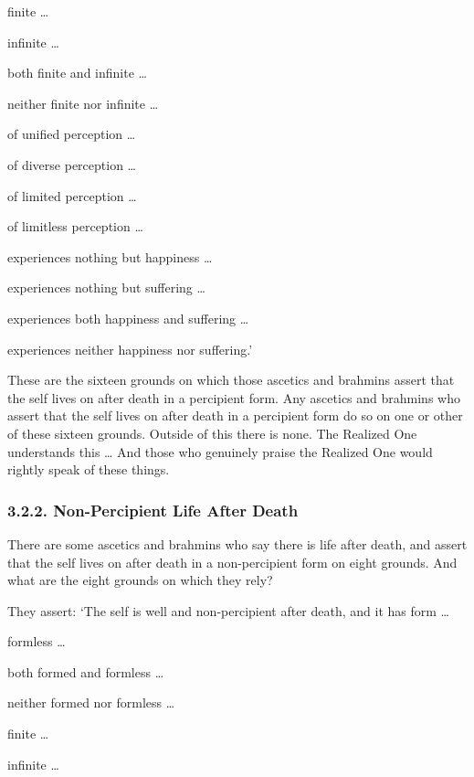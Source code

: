 \documentclass[12pt,openany]{book}%
\begin{document}
finite … 

infinite … 

both finite and infinite … 

neither finite nor infinite … 

of unified perception … 

of diverse perception … 

of limited perception … 

of limitless perception … 

experiences nothing but happiness … 

experiences nothing but suffering … 

experiences both happiness and suffering … 

experiences neither happiness nor suffering.’ 

These are the sixteen grounds on which those ascetics and brahmins assert that the self lives on after death in a percipient form. Any ascetics and brahmins who assert that the self lives on after death in a percipient form do so on one or other of these sixteen grounds. Outside of this there is none. The Realized One understands this … And those who genuinely praise the Realized One would rightly speak of these things. 

\subsubsection*{3.2.2. Non-Percipient Life After Death }

There are some ascetics and brahmins who say there is life after death, and assert that the self lives on after death in a non-percipient form on eight grounds. And what are the eight grounds on which they rely? 

They assert: ‘The self is well and non-percipient after death, and it has form … 

formless … 

both formed and formless … 

neither formed nor formless … 

finite … 

infinite … 
\end{document}
